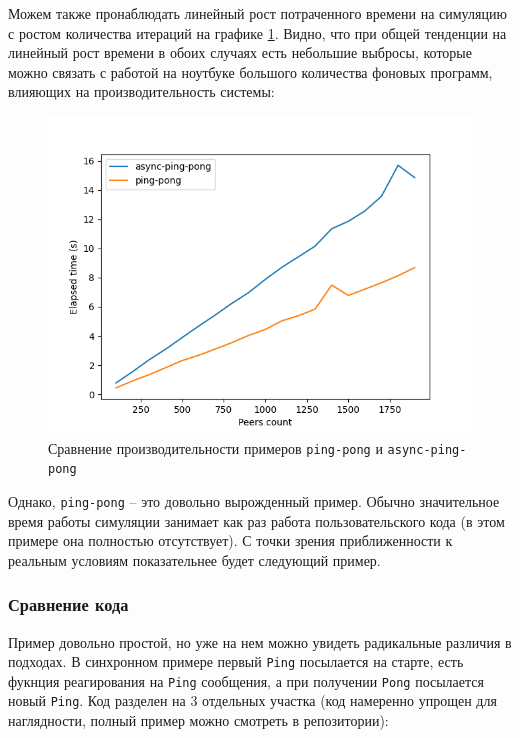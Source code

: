 Можем также пронаблюдать линейный рост потраченного времени на симуляцию с ростом количества итераций на графике \ref{async-perf}. Видно, что при общей тенденции на линейный рост времени в обоих случаях есть небольшие выбросы, которые можно связать с работой на ноутбуке большого количества фоновых программ, влияющих на производительность системы:
\begin{figure}[H]
    \centering
    \includegraphics[width=0.9\linewidth]{images/async-ping-pong.png}
    \caption{Сравнение производительности примеров \texttt{ping-pong} и \texttt{async-ping-pong}}
    \label{async-perf}
\end{figure}

Однако, \texttt{ping-pong} -- это довольно вырожденный пример. Обычно значительное время работы симуляции занимает как раз работа пользовательского кода (в этом примере она полностью отсутствует). С точки зрения приближенности к реальным условиям показательнее будет следующий пример. 

\subsubsection{Сравнение кода}

Пример довольно простой, но уже на нем можно увидеть радикальные различия в подходах. В синхронном примере первый \texttt{Ping} посылается на старте, есть фукнция реагирования на \texttt{Ping} сообщения, а при получении \texttt{Pong} посылается новый \texttt{Ping}. Код разделен на 3 отдельных участка (код намеренно упрощен для наглядности, полный пример можно смотреть в репозитории\cite{async-ping-pong-example}): 

